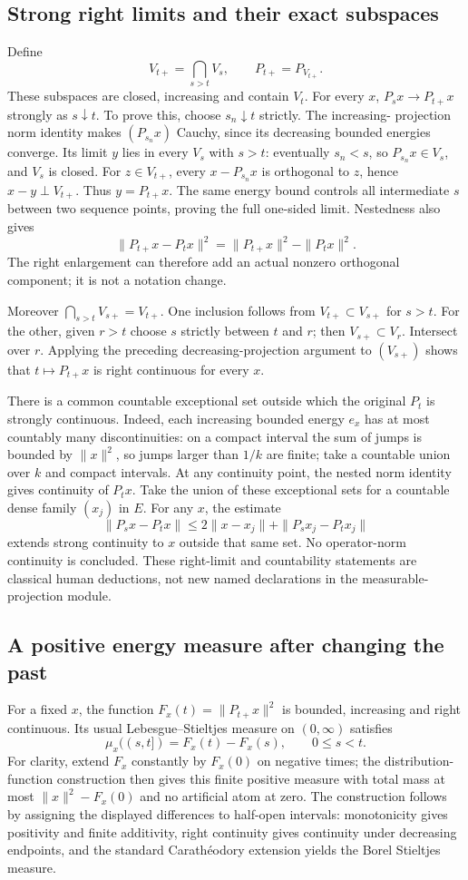 \documentclass[11pt]{article}
\begin{document}
\subsection*{Strong right limits and their exact subspaces}
Define
\[
 V_{t+}=\bigcap_{s>t}V_s,\qquad P_{t+}=P_{V_{t+}}.
\]
These subspaces are closed, increasing and contain $V_t$.
For every $x$, $P_sx\to P_{t+}x$ strongly as $s\downarrow t$.
To prove this, choose $s_n\downarrow t$ strictly. The increasing-
projection norm identity makes $(P_{s_n}x)$ Cauchy, since its
decreasing bounded energies converge. Its limit $y$ lies in every
$V_s$ with $s>t$: eventually $s_n<s$, so $P_{s_n}x\in V_s$, and
$V_s$ is closed. For $z\in V_{t+}$, every $x-P_{s_n}x$ is
orthogonal to $z$, hence $x-y\perp V_{t+}$. Thus $y=P_{t+}x$.
The same energy bound controls all intermediate $s$ between two
sequence points, proving the full one-sided limit. Nestedness
also gives
\[
 \|P_{t+}x-P_tx\|^2=\|P_{t+}x\|^2-\|P_tx\|^2.
\]
The right enlargement can therefore add an actual nonzero
orthogonal component; it is not a notation change.

Moreover $\bigcap_{s>t}V_{s+}=V_{t+}$. One inclusion follows from
$V_{t+}\subset V_{s+}$ for $s>t$. For the other, given $r>t$ choose
$s$ strictly between $t$ and $r$; then $V_{s+}\subset V_r$.
Intersect over $r$. Applying the preceding decreasing-projection
argument to $(V_{s+})$ shows that $t\mapsto P_{t+}x$ is right
continuous for every $x$.

There is a common countable exceptional set outside which the
original $P_t$ is strongly continuous. Indeed, each increasing
bounded energy $e_x$ has at most countably many discontinuities:
on a compact interval the sum of jumps is bounded by $\|x\|^2$,
so jumps larger than $1/k$ are finite; take a countable union over
$k$ and compact intervals. At any continuity point, the nested
norm identity gives continuity of $P_tx$. Take the union of these
exceptional sets for a countable dense family $(x_j)$ in $E$.
For any $x$, the estimate
\[
 \|P_sx-P_tx\|\le2\|x-x_j\|+\|P_sx_j-P_tx_j\|
\]
extends strong continuity to $x$ outside that same set. No
operator-norm continuity is concluded. These right-limit and
countability statements are classical human deductions, not new
named declarations in the measurable-projection module.

\subsection*{A positive energy measure after changing the past}
For a fixed $x$, the function $F_x(t)=\|P_{t+}x\|^2$ is bounded,
increasing and right continuous. Its usual Lebesgue--Stieltjes
measure on $(0,\infty)$ satisfies
\[
 \mu_x((s,t])=F_x(t)-F_x(s),\qquad 0\le s<t.
\]
For clarity, extend $F_x$ constantly by $F_x(0)$ on negative times;
the distribution-function construction then gives this finite
positive measure with total mass at most $\|x\|^2-F_x(0)$ and no
artificial atom at zero. The construction follows by assigning
the displayed differences to half-open intervals: monotonicity
gives positivity and finite additivity, right continuity gives
continuity under decreasing endpoints, and the standard
Carath\'eodory extension yields the Borel Stieltjes measure.
\end{document}
